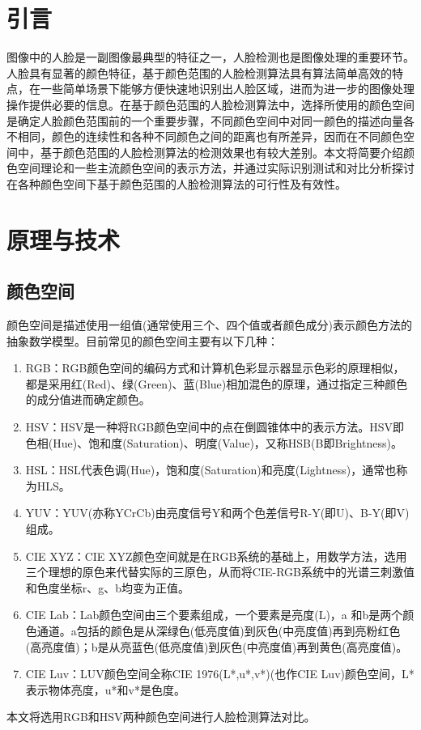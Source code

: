 \documentclass[a4paper]{ctexart}
\begin{document}
\tableofcontents %
\newpage
\begin{spacing}{1.5}
\songti{}
\section{引言}
图像中的人脸是一副图像最典型的特征之一，人脸检测也是图像处理的重要环节。人脸具有显著的颜色特征，基于颜色范围的人脸检测算法具有算法简单高效的特点，在一些简单场景下能够方便快速地识别出人脸区域，进而为进一步的图像处理操作提供必要的信息\cite{RN46}。在基于颜色范围的人脸检测算法中，选择所使用的颜色空间是确定人脸颜色范围前的一个重要步骤，不同颜色空间中对同一颜色的描述向量各不相同，颜色的连续性和各种不同颜色之间的距离也有所差异\cite{RN48}，因而在不同颜色空间中，基于颜色范围的人脸检测算法的检测效果也有较大差别。本文将简要介绍颜色空间理论和一些主流颜色空间的表示方法，并通过实际识别测试和对比分析探讨在各种颜色空间下基于颜色范围的人脸检测算法的可行性及有效性。
\section{原理与技术}
\subsection{颜色空间}
颜色空间是描述使用一组值(通常使用三个、四个值或者颜色成分)表示颜色方法的抽象数学模型。目前常见的颜色空间主要有以下几种：
\begin{enumerate}
	\item RGB：RGB颜色空间的编码方式和计算机色彩显示器显示色彩的原理相似，都是采用红(Red)、绿(Green)、蓝(Blue)相加混色的原理，通过指定三种颜色的成分值进而确定颜色\cite{RN47}。
	\item HSV：HSV是一种将RGB颜色空间中的点在倒圆锥体中的表示方法。HSV即色相(Hue)、饱和度(Saturation)、明度(Value)，又称HSB(B即Brightness)。
	\item HSL：HSL代表色调(Hue)，饱和度(Saturation)和亮度(Lightness)，通常也称为HLS\cite{RN50}。
	\item YUV：YUV(亦称YCrCb)由亮度信号Y和两个色差信号R-Y(即U)、B-Y(即V)组成\cite{RN52}。
	\item CIE XYZ：CIE XYZ颜色空间就是在RGB系统的基础上，用数学方法，选用三个理想的原色来代替实际的三原色，从而将CIE-RGB系统中的光谱三刺激值和色度坐标r、g、b均变为正值。
	\item CIE Lab：Lab颜色空间由三个要素组成，一个要素是亮度(L)，a 和b是两个颜色通道。a包括的颜色是从深绿色(低亮度值)到灰色(中亮度值)再到亮粉红色(高亮度值)；b是从亮蓝色(低亮度值)到灰色(中亮度值)再到黄色(高亮度值)。
	\item CIE Luv：LUV颜色空间全称CIE 1976(L*,u*,v*)(也作CIE Luv)颜色空间，L*表示物体亮度，u*和v*是色度\cite{RN51}。
\end{enumerate}
本文将选用RGB和HSV两种颜色空间进行人脸检测算法对比。

\end{spacing}
\end{document}
